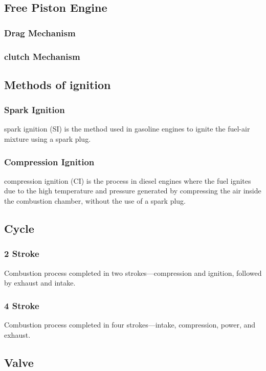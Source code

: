 \documentclass{article}
\begin{document}
\subsection*{Free Piston Engine}
\subsubsection*{Drag Mechanism}
\subsubsection*{clutch Mechanism} 

\vspace{1cm}

\subsection*{Methods of ignition}
\subsubsection*{Spark Ignition}
spark ignition (SI) is the method used in gasoline engines to ignite the fuel-air mixture using a spark plug.

\subsubsection*{Compression Ignition}
compression ignition (CI) is the process in diesel engines where the fuel ignites due to the high temperature and pressure generated by compressing the air inside the combustion chamber, without the use of a spark plug.


\subsection*{Cycle}
\subsubsection*{2 Stroke}
Combustion process completed in two strokes—compression and ignition, followed by exhaust and intake.

\subsubsection*{4 Stroke}
Combustion process completed in four strokes—intake, compression, power, and exhaust.
\vspace{0.5cm}

\subsection*{Valve}
\end{document}
